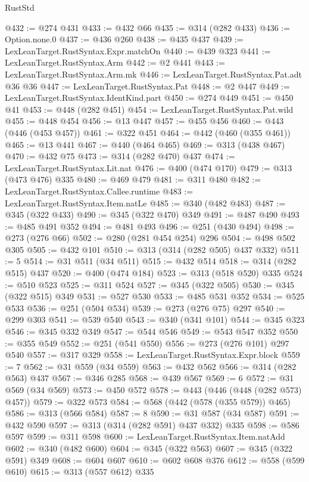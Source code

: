 \begin{lexlean}{RustStd}
\begin{coremodule}
@432 := @274 @431
@433 := @432 @66
@435 := @314 (@282 @433)
@436 := Option.none.{0}
@437 := @436 @260
@438 := @435 @437
@439 := LexLeanTarget.RustSyntax.Expr.matchOn
@440 := @439 @323
@441 := LexLeanTarget.RustSyntax.Arm
@442 := @2 @441
@443 := LexLeanTarget.RustSyntax.Arm.mk
@446 := LexLeanTarget.RustSyntax.Pat.adt @36 @36
@447 := LexLeanTarget.RustSyntax.Pat
@448 := @2 @447
@449 := LexLeanTarget.RustSyntax.IdentKind.part
@450 := @274 @449
@451 := @450 @41
@453 := @448 (@282 @451)
@454 := LexLeanTarget.RustSyntax.Pat.wild
@455 := @448 @454
@456 := @13 @447
@457 := @455 @456
@460 := @443 (@446 (@453 @457))
@461 := @322 @451
@464 := @442 (@460 (@355 @461))
@465 := @13 @441
@467 := @440 (@464 @465)
@469 := @313 (@438 @467)
@470 := @432 @75
@473 := @314 (@282 @470) @437
@474 := LexLeanTarget.RustSyntax.Lit.nat
@476 := @400 (@474 @170)
@479 := @313 (@473 @476) @335
@480 := @469 @479
@481 := @311 @480
@482 := LexLeanTarget.RustSyntax.Callee.runtime
@483 := LexLeanTarget.RustSyntax.Item.natLe
@485 := @340 (@482 @483)
@487 := @345 (@322 @433)
@490 := @345 (@322 @470) @349
@491 := @487 @490
@493 := @485 @491 @352
@494 := @481 @493
@496 := @251 (@430 @494)
@498 := @273 (@276 @66)
@502 := @280 (@281 @454 @254) @296
@504 := @498 @502 @305
@505 := @432 @101
@510 := @313 (@314 (@282 @505) @437 @332)
@511 := 5
@514 := @31 @511 (@34 @511)
@515 := @432 @514
@518 := @314 (@282 @515) @437
@520 := @400 (@474 @184)
@523 := @313 (@518 @520) @335
@524 := @510 @523
@525 := @311 @524
@527 := @345 (@322 @505)
@530 := @345 (@322 @515) @349
@531 := @527 @530
@533 := @485 @531 @352
@534 := @525 @533
@536 := @251 (@504 @534)
@539 := @273 (@276 @75) @297
@540 := @299 @303
@541 := @539 @540
@543 := @340 (@341 @101)
@544 := @345 @323
@546 := @345 @332 @349
@547 := @544 @546
@549 := @543 @547 @352
@550 := @355 @549
@552 := @251 (@541 @550)
@556 := @273 (@276 @101) @297 @540
@557 := @317 @329
@558 := LexLeanTarget.RustSyntax.Expr.block
@559 := 7
@562 := @31 @559 (@34 @559)
@563 := @432 @562
@566 := @314 (@282 @563) @437
@567 := @346 @285
@568 := @439 @567
@569 := 6
@572 := @31 @569 (@34 @569)
@573 := @450 @572
@578 := @443 (@446 (@448 (@282 @573) @457))
@579 := @322 @573
@584 := @568 (@442 (@578 (@355 @579)) @465)
@586 := @313 (@566 @584)
@587 := 8
@590 := @31 @587 (@34 @587)
@591 := @432 @590
@597 := @313 (@314 (@282 @591) @437 @332) @335
@598 := @586 @597
@599 := @311 @598
@600 := LexLeanTarget.RustSyntax.Item.natAdd
@602 := @340 (@482 @600)
@604 := @345 (@322 @563)
@607 := @345 (@322 @591) @349
@608 := @604 @607
@610 := @602 @608 @376
@612 := @558 (@599 @610)
@615 := @313 (@557 @612) @335

\end{coremodule}
\end{lexlean}
